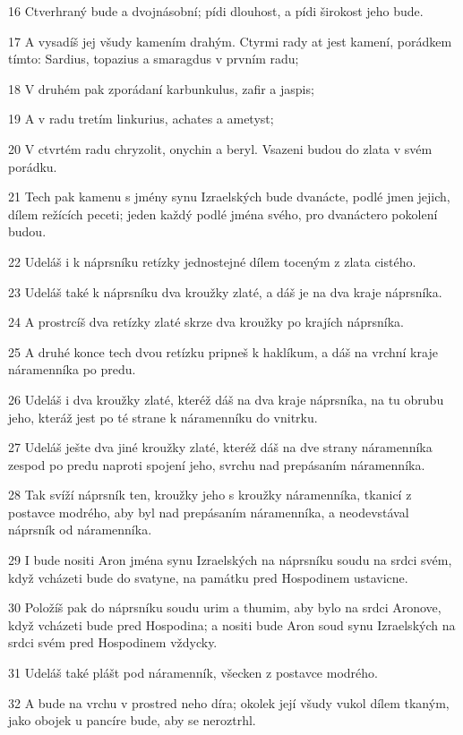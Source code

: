 \par 16 Ctverhraný bude a dvojnásobní; pídi dlouhost, a pídi širokost jeho bude.
\par 17 A vysadíš jej všudy kamením drahým. Ctyrmi rady at jest kamení, porádkem tímto: Sardius, topazius a smaragdus v prvním radu;
\par 18 V druhém pak zporádaní karbunkulus, zafir a jaspis;
\par 19 A v radu tretím linkurius, achates a ametyst;
\par 20 V ctvrtém radu chryzolit, onychin a beryl. Vsazeni budou do zlata v svém porádku.
\par 21 Tech pak kamenu s jmény synu Izraelských bude dvanácte, podlé jmen jejich, dílem režících peceti; jeden každý podlé jména svého, pro dvanáctero pokolení budou.
\par 22 Udeláš i k náprsníku retízky jednostejné dílem toceným z zlata cistého.
\par 23 Udeláš také k náprsníku dva kroužky zlaté, a dáš je na dva kraje náprsníka.
\par 24 A prostrcíš dva retízky zlaté skrze dva kroužky po krajích náprsníka.
\par 25 A druhé konce tech dvou retízku pripneš k haklíkum, a dáš na vrchní kraje náramenníka po predu.
\par 26 Udeláš i dva kroužky zlaté, kteréž dáš na dva kraje náprsníka, na tu obrubu jeho, kteráž jest po té strane k náramenníku do vnitrku.
\par 27 Udeláš ješte dva jiné kroužky zlaté, kteréž dáš na dve strany náramenníka zespod po predu naproti spojení jeho, svrchu nad prepásaním náramenníka.
\par 28 Tak svíží náprsník ten, kroužky jeho s kroužky náramenníka, tkanicí z postavce modrého, aby byl nad prepásaním náramenníka, a neodevstával náprsník od náramenníka.
\par 29 I bude nositi Aron jména synu Izraelských na náprsníku soudu na srdci svém, když vcházeti bude do svatyne, na památku pred Hospodinem ustavicne.
\par 30 Položíš pak do náprsníku soudu urim a thumim, aby bylo na srdci Aronove, když vcházeti bude pred Hospodina; a nositi bude Aron soud synu Izraelských na srdci svém pred Hospodinem vždycky.
\par 31 Udeláš také plášt pod náramenník, všecken z postavce modrého.
\par 32 A bude na vrchu v prostred neho díra; okolek její všudy vukol dílem tkaným, jako obojek u pancíre bude, aby se neroztrhl.
